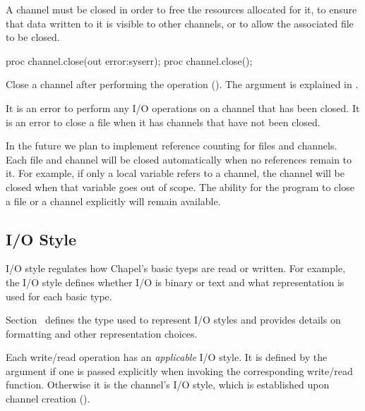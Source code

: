 A channel must be closed in order to free the resources allocated for it,
to ensure that data written to it is visible to other channels,
or to allow the associated file to be closed.

\begin{protohead}
proc channel.close(out error:syserr);
proc channel.close();
\end{protohead}
\begin{protobody}
Close a channel after performing the  operation
().
The  argument is explained in .
\end{protobody}

It is an error to perform any I/O operations on a channel
that has been closed.
It is an error to close a file when it has channels that
have not been closed.

\begin{future}
In the future we plan to implement reference counting for files
and channels. Each file and channel will be closed automatically
when no references remain to it. For example, if only a local
variable refers to a channel, the channel will be closed
when that variable goes out of scope.
The ability for the program to close a file or a channel
explicitly will remain available.
\end{future}


\subsection{I/O Style}
\label{IO_io_style}

I/O style regulates how Chapel's basic tyeps are read or written.
For example, the I/O style defines whether I/O is binary or text
and what representation is used for each basic type.

Section~ defines the  type
used to represent I/O styles and provides details on formatting
and other representation choices.

Each write/read operation has an \emph{applicable} I/O style.
It is defined by the  argument if one is passed explicitly
when invoking the corresponding write/read function.
Otherwise it is the channel's I/O style, which is established
upon channel creation ().


